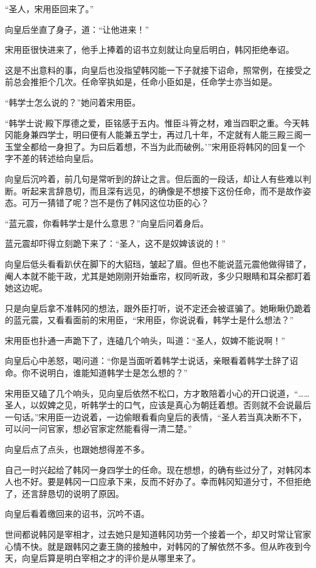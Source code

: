 “圣人，宋用臣回来了。”

向皇后坐直了身子，道：“让他进来！”

宋用臣很快进来了，他手上捧着的诏书立刻就让向皇后明白，韩冈拒绝奉诏。

这是不出意料的事，向皇后也没指望韩冈能一下子就接下诏命，照常例，在接受之前总会推拒个几次。任命宰执如是，任命小臣如是，任命学士亦当如是。

“韩学士怎么说的？”她问着宋用臣。

“韩学士说‘殿下厚德之爱，臣铭感于五内。惟臣斗筲之材，难当四职之重。今天韩冈能身兼四学士，明曰便有人能兼五学士，再过几十年，不定就有人能三殿三阁一玉堂全都给一身担了。为曰后着想，不当为此而破例。’”宋用臣将韩冈的回复一个字不差的转述给向皇后。

向皇后沉吟着，前几句是常听到的辞让之言。但后面的一段话，却让人有些难以判断。听起来言辞恳切，而且深有远见，的确像是不想接下这份任命，而不是故作姿态。可万一猜错了呢？岂不是伤了韩冈这位功臣的心？

“蓝元震，你看韩学士是什么意思？”向皇后问着身后。

蓝元震却吓得立刻跪下来了：“圣人，这不是奴婢该说的！”

向皇后低头看看趴伏在脚下的大貂珰，皱起了眉。但也不能说蓝元震他做得错了，阉人本就不能干政，尤其是她刚刚开始垂帘，权同听政，多少只眼睛和耳朵都盯着她这边呢。

只是向皇后拿不准韩冈的想法，跟外臣打听，说不定还会被诓骗了。她瞅瞅仍跪着的蓝元震，又看看面前的宋用臣，“宋用臣，你说说看，韩学士是什么想法？”

宋用臣也扑通一声跪下了，连磕几个响头，叫道：“圣人，奴婢不能说啊！”

向皇后心中恙怒，喝问道：“你是当面听着韩学士说话，亲眼看着韩学士辞了诏命。你不说明白，谁能知道韩学士是怎么想的？”

宋用臣又磕了几个响头，见向皇后依然不松口，方才敢陪着小心的开口说道，“……圣人，以奴婢之见，听韩学士的口气，应该是真心为朝廷着想。否则就不会说最后一句话。”宋用臣一边说着，一边偷眼看看向皇后的表情，“圣人若当真决断不下，可以问一问官家，想必官家定然能看得一清二楚。”

向皇后点了点头，也跟她想得差不多。

自己一时兴起给了韩冈一身四学士的任命。现在想想，的确有些过分了，对韩冈本人也不好。要是韩冈一口应承下来，反而不好办了。幸而韩冈知道分寸，不但拒绝了，还言辞恳切的说明了原因。

向皇后看着缴回来的诏书，沉吟不语。

世间都说韩冈是宰相才，过去她只是知道韩冈功劳一个接着一个，却又时常让官家心情不快。就是跟韩冈之妻王旖的接触中，对韩冈的了解依然不多。但从昨夜到今天，向皇后算是明白宰相之才的评价是从哪里来了。

